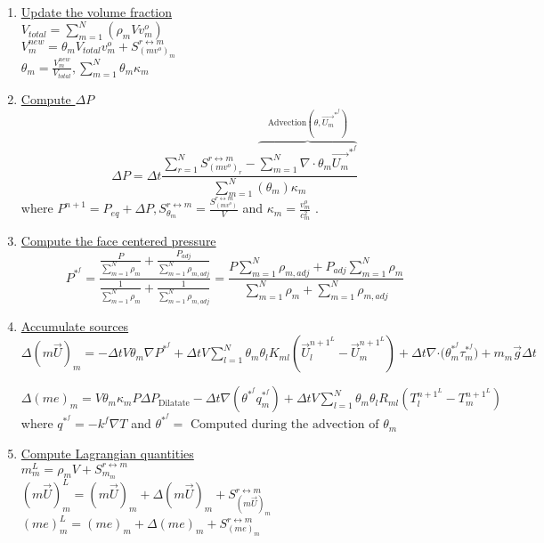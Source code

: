 \documentclass[fleqn]{article}
\newcommand{\SUM}[1]    {\ensuremath{\sum \limits_{{#1}=1}^N }}
\newcommand{\bigS}[1]   {\ensuremath{S^{r \leftrightarrow m}_{#1}}  }
\newcommand{\U}         {{\vec{U}}}
\newcommand{\delt}      {\ensuremath{\Delta{t}} }
\begin{document}
\begin{enumerate}
\item \underline{Update the volume fraction}\\
$V_{total} = \SUM{m}(\rho_m V v^o_m)$\\
$V_m^{new} = \theta_m V_{total}  v^o_m + \bigS{(m v^o)_m}$\\
$\theta_m = \frac{V_m^{new}}{V_{total}}, \SUM{m} \theta_m \kappa_m $
\item \underline{Compute $\Delta P$} 
\[
     \Delta P = \Delta t 
                        \frac{   \SUM{r}  \bigS{(m v^o)_r}
                      - \overbrace { \SUM{m} \nabla \cdot \theta_m \vec{U_m}^{*^{f}} } ^{\text{Advection}(\theta, \vec{U_m}^{*^{f}}) } }
                       {\SUM{m} (\theta_m) \kappa_m}
\]
where $P^{n+1} = P_{eq} + \Delta{P}, \bigS{\theta_m} = \frac{ \bigS{(m v^o)}}{V}$
and $\kappa_m = \frac{v^o_m}{c^2_m}$ .
\item \underline{Compute the face centered pressure}
\[
    P^{*^{f}} = \frac{\frac{P}{\SUM{m} \rho_m} + \frac{P_{adj}}{\SUM{m} \rho_{m, adj}}}
                     {\frac{1}{\SUM{m} \rho_m} + \frac{1}{\SUM{m} \rho_{m, adj}}}
%
              =\frac{ {P \SUM{m} \rho_{m,adj}} + {P_{adj} \SUM{m} \rho_{m} }  }
                 { {\SUM{m} \rho_m} + {\SUM{m} \rho_{m, adj}  }  }
\]
\newpage
\item \underline{Accumulate sources}\\  
 $\Delta(m\vec{U})_m = 
    - \delt V \theta_m \nabla{ P^{*^f}} 
    + \delt V \SUM{l} \theta_m \theta_l K_{ml}(\U_l^{{n+1}^L} - \U_m^{{n+1}^L} )
    + \delt \nabla{ \cdot (\theta^{*^f}_m \tau^{*^f}_m})
    + m_m \vec{g}\delt$
    
 $\Delta(me)_m =  
    V \theta_m \kappa_m P \Delta P_{\text{Dilatate}}
    - \delt \nabla (\theta^{*^f} q_{m}^{*^f})
    + \delt V \SUM{l}  \theta_m \theta_l R_{ml}(T_l^{{n+1}^L} - T_m^{{n+1}^L} )$ \\
where $q^{*^f} = - k^f \nabla T$ and $\theta^{*^f} = \text{ Computed during the advection of } \theta_m$

\item \underline{Compute Lagrangian quantities}\\
    $m^L_m     = {\rho_m}V + \bigS{m_m} $ \\
    $(m\U)^L_m = (m\U)_m + \Delta(m\U)_m + \bigS{(m\U)_m}$ \\
    $(m e)^L_m = (m e)_m + \Delta(m e)_m + \bigS{(me)_m}$\\


\end{enumerate}
\end{document}
